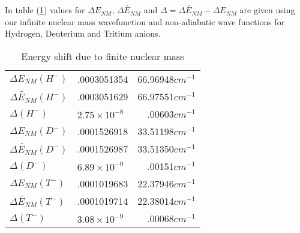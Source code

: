 \documentclass[12pt,thmsa]{article}
\begin{document}
In table (\ref{NMtab}) values for $\Delta E_{NM}$, $\widetilde{\Delta E_{NM}}
$ and $\Delta =\widetilde{\Delta E_{NM}}-\Delta E_{NM}$ are given using our
infinite nuclear mass wavefunction and non-adiabatic wave functions for
Hydrogen, Deuterium and Tritium anions.

\begin{table}[tbp] \centering%
\begin{tabular}{lll}
\hline\hline
$\Delta E_{NM}\left( H^{-}\right) $ & .0003051354 & 66.96948$cm^{-1}$ \\ 
$\widetilde{\Delta E_{NM}}\left( H^{-}\right) $ & .0003051629 & 
\multicolumn{1}{r}{66.97551$cm^{-1}$} \\ 
$\Delta \left( H^{-}\right) $ & $2.75\times 10^{-8}$ & \multicolumn{1}{r}{
.00603$cm^{-1}$} \\ \hline
$\Delta E_{NM}\left( D^{-}\right) $ & .0001526918 & \multicolumn{1}{r}{
33.51198$cm^{-1}$} \\ 
$\widetilde{\Delta E_{NM}}\left( D^{-}\right) $ & .0001526987 & 
\multicolumn{1}{r}{33.51350$cm^{-1}$} \\ 
$\Delta \left( D^{-}\right) $ & $6.89\times 10^{-9}$ & \multicolumn{1}{r}{
.00151$cm^{-1}$} \\ \hline
$\Delta E_{NM}\left( T^{-}\right) $ & .0001019683 & \multicolumn{1}{r}{
22.37946$cm^{-1}$} \\ 
$\widetilde{\Delta E_{NM}}\left( T^{-}\right) $ & .0001019714 & 
\multicolumn{1}{r}{22.38014$cm^{-1}$} \\ 
$\Delta \left( T^{-}\right) $ & $3.08\times 10^{-9}$ & \multicolumn{1}{r}{
.00068$cm^{-1}$} \\ \hline\hline
\end{tabular}
\caption{Energy shift due to finite nuclear mass\label{NMtab}}%
\end{table}%
\end{document}
